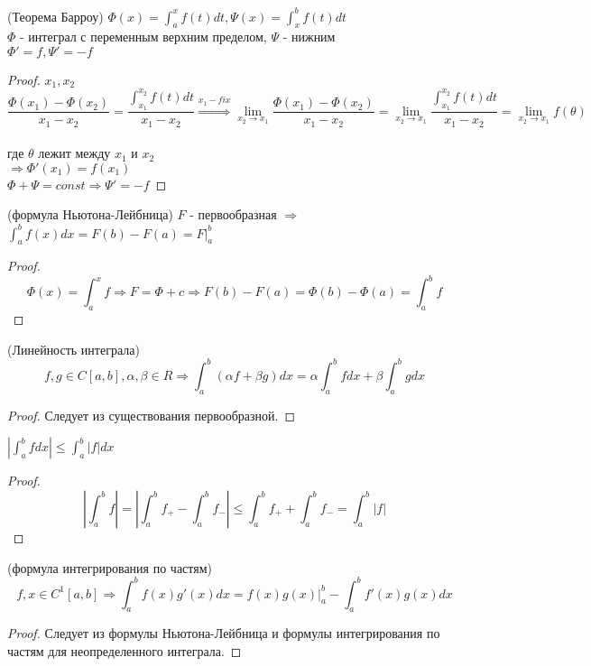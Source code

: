 \begin{properties}
    \item(Теорема Барроу) $\Phi(x) = \int_a^x f(t) dt, \Psi(x) = \int_x^b f(t) dt$ \\
    $\Phi$ - интеграл с переменным верхним пределом, $\Psi$ - нижним \\
    $\Phi' = f, \Psi' = -f$
    \begin{proof}
        $x_1, x_2$ 
        \[\frac {\Phi(x_1) - \Phi(x_2)} {x_1 - x_2}
        = \frac {\int_{x_1}^{x_2} f(t) dt} {x_1 - x_2}  
        \stackrel{x_1- fix}{\Rightarrow} \lim_{x_2 \to x_1} \frac {\Phi(x_1) - \Phi(x_2)} {x_1 - x_2}
        = \lim_{x_2 \to x_1} \frac {\int_{x_1}^{x_2} f(t) dt} {x_1 - x_2}
        = \lim_{x_2 \to x_1} f(\theta)\] \\
        где $\theta$ лежит между $x_1$ и $x_2$ \\
        $\Rightarrow \Phi'(x_1) = f(x_1)$ \\
        $\Phi + \Psi = const \Rightarrow \Psi' = -f$
    \end{proof}

    \item(формула Ньютона-Лейбница) $F$ - первообразная $\Rightarrow$ \\
    $\int_a^b f(x) dx = F(b) - F(a) = F|_a^b$
    \begin{proof}
        \[ \Phi(x) = \int_a^x f \Rightarrow F = \Phi + c \Rightarrow F(b) - F(a)
        = \Phi(b) - \Phi(a) = \int_a^b f \]
    \end{proof}

    \item(Линейность интеграла) \[f, g \in C[a, b], \alpha, \beta \in R \Rightarrow
    \int_a^b (\alpha f + \beta g) dx = \alpha \int_a^b f dx + \beta \int_a^b g dx \] 
    \begin{proof}
        Следует из существования первообразной.
    \end{proof}
    \item $|\int_a^b f dx| \leq \int_a^b |f| dx$
    \begin{proof}
        \[ \left|\int_a^b f\right| = \left|\int_a^b f_+ - \int_a^b f_-\right| \leq
            \int_a^b f_+ + \int_a^b f_- = \int_a^b |f| \]
    \end{proof}
    
    \item(формула интегрирования по частям)
    \[f, x \in C^1[a, b] \Rightarrow
    \int_a^b f(x) g'(x) dx = f(x)g(x)\bigg|_a^b - \int_a^b f'(x)g(x) dx \]

    \begin{proof}
        Следует из формулы Ньютона-Лейбница и формулы интегрирования по частям для неопределенного интеграла.
    \end{proof}


\end{properties}
